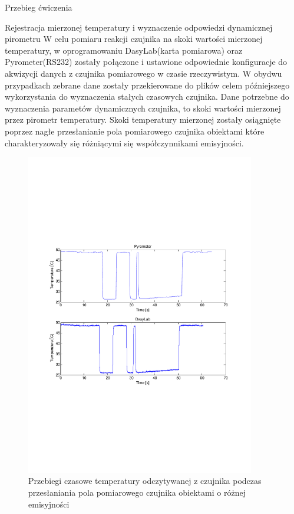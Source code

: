 \documentclass[12pt]{article}
\begin{document}
\begin{section}{Przebieg ćwiczenia}
	\begin{subsection}{Rejestracja mierzonej temperatury i wyznaczenie odpowiedzi
					dynamicznej pirometru}
		W celu pomiaru reakcji czujnika na skoki wartości mierzonej temperatury, w
		oprogramowaniu DasyLab(karta pomiarowa) oraz Pyrometer(RS232) zostały
		połączone i ustawione odpowiednie konfiguracje do akwizycji danych z czujnika
		pomiarowego w czasie rzeczywistym. W obydwu przypadkach zebrane dane zostały
		przekierowane do plików celem późniejszego wykorzystania do wyznaczenia
		stałych czasowych czujnika.
		Dane potrzebne do wyznaczenia parametów dynamicznych czujnika, to skoki
		wartości mierzonej przez pirometr temperatury.
		Skoki temperatury mierzonej zostały osiągnięte poprzez nagłe przesłanianie
		pola pomiarowego czujnika obiektami które charakteryzowały się różniącymi się
		współczynnikami emisyjności.
		\begin{figure}[!htb]
			\begin{center} 
				\includegraphics[trim=5cm 8cm 5cm 8cm,width=10cm]{../res/img/T_f(t).pdf} 
			\end{center}
			\caption{Przebiegi czasowe temperatury odczytywanej z czujnika podczas
			przesłaniania pola pomiarowego czujnika obiektami o różnej emisyjności}
			\label{rys:pirt_T}
		\end{figure}
		

\end{subsection}
\end{section}
\end{document}
